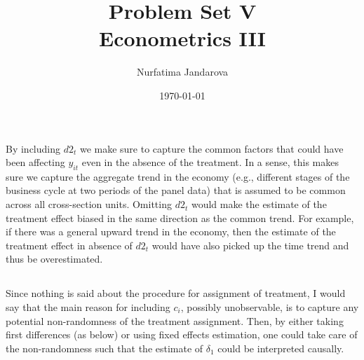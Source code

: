 \documentclass[]{article}
\title{Problem Set V \\ \large Econometrics III}
\author{Nurfatima Jandarova}
\date{\today}
\begin{document}
\maketitle
\section{}
\subsection{}
By including ${d2}_t$ we make sure to capture the common factors that could have been affecting $y_{it}$ even in the absence of the treatment. In a sense, this makes sure we capture the aggregate trend in the economy (e.g., different stages of the business cycle at two periods of the panel data) that is assumed to be common across all cross-section units. Omitting ${d2}_t$ would make the estimate of the treatment effect biased in the same direction as the common trend. For example, if there was a general upward trend in the economy, then the estimate of the treatment effect in absence of ${d2}_t$ would have also picked up the time trend and thus be overestimated.

\subsection{}
Since nothing is said about the procedure for assignment of treatment, I would say that the main reason for including $c_i$, possibly unobservable, is to capture any potential non-randomness of the treatment assignment. Then, by either taking first differences (as below) or using fixed effects estimation, one could take care of the non-randomness such that the estimate of $\delta_1$ could be interpreted causally.
\end{document}

